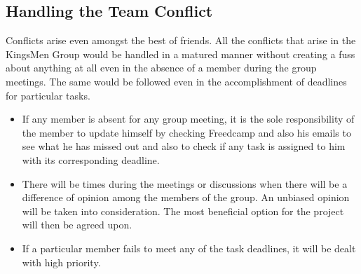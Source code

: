 \documentclass[11pt]{article}
\begin{document}
\subsection{Handling the Team Conflict}

Conflicts arise even amongst the best of friends. All the conflicts that arise in the KingsMen Group would be handled in a matured manner without creating a fuss about anything at all even in the absence of a member during the group meetings. The same would be followed even in the accomplishment of deadlines for particular tasks.\\


\begin{itemize}
\item If any member is absent for any group meeting, it is the sole responsibility of the member to update himself by checking Freedcamp and also his emails to see what he has missed out and also to check if any task is assigned to him with its corresponding deadline.
\end{itemize}

\begin{itemize}
\item There will be times during the meetings or discussions when there will be a difference of opinion among the members of the group. An unbiased opinion will be taken into consideration. The most beneficial option for the project will then be agreed upon.
\end{itemize}

\begin{itemize}
\item If a particular member fails to meet any of the task deadlines, it will be dealt with high priority.
\end{itemize}
\end{document}
